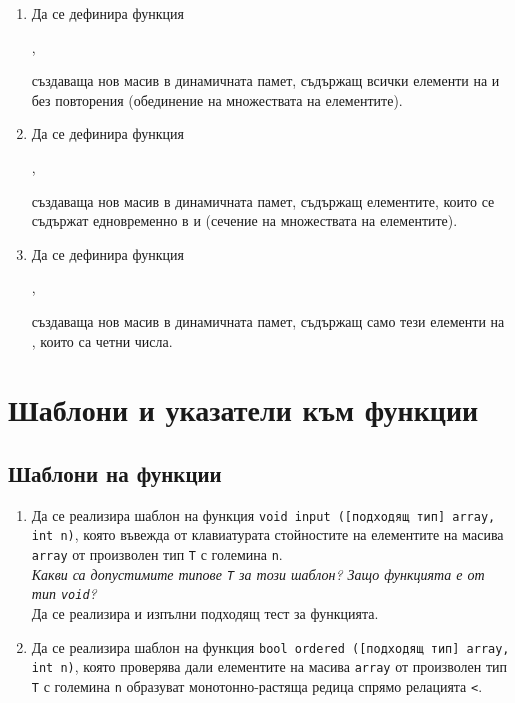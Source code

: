 {\begin{enumerate}[resume]
  \item Да се дефинира функция 
  
  ,
  
  създаваща нов масив в динамичната памет, съдържащ всички  елементи на  и  без повторения (обединение на множествата на елементите).

  \item Да се дефинира функция 
  
  ,
  
  създаваща нов масив в динамичната памет, съдържащ елементите, които се съдържат едновременно в  и  (сечение на множествата на елементите).

  \item Да се дефинира функция 
  
  ,
  
  създаваща нов масив в динамичната памет, съдържащ само тези елементи на , които са четни числа.

\end{enumerate}

\pagebreak


\clearpage\section {Шаблони и указатели към функции}

\subsection{Шаблони на функции}

\begin{enumerate}

	\item Да се реализира шаблон на функция \texttt{void input ([подходящ тип] array, int n)}, която въвежда от клавиатурата стойностите на елементите на масива \texttt{array} от произволен тип \texttt{T} с големина \texttt{n}. \\

	\textit{Какви са допустимите типове \texttt{T} за този шаблон? Защо функцията е от тип \texttt{void}?}\\

	Да се реализира и изпълни подходящ тест за функцията.

	\item Да се реализира шаблон на функция \texttt{bool ordered ([подходящ тип] array, int n)}, която проверява дали елементите на масива \texttt{array} от произволен тип \texttt{T} с големина \texttt{n} образуват монотонно-растяща редица спрямо релацията \texttt{<}.\\


\end{enumerate}}
